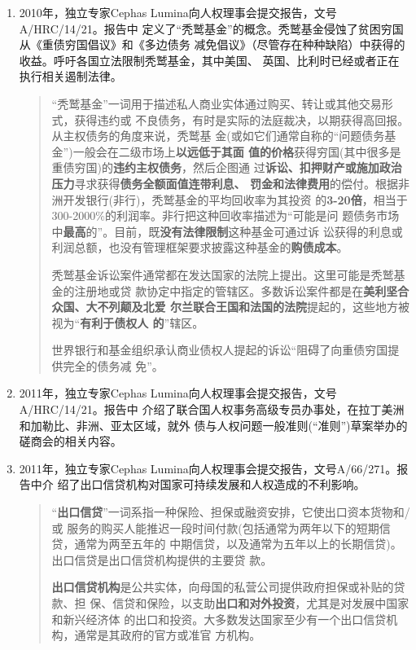 \begin{enumerate}
\item 2010年，独立专家Cephas Lumina向人权理事会提交报告，文号A/HRC/14/21。报告中
  定义了“秃鹫基金”的概念。秃鹫基金侵蚀了贫困穷国从《重债穷国倡议》和《多边债务
  减免倡议》（尽管存在种种缺陷）中获得的收益。呼吁各国立法限制秃鹫基金，其中美国、
  英国、比利时已经或者正在执行相关遏制法律。
  \begin{quotation}
    “秃鹫基金”一词用于描述私人商业实体通过购买、转让或其他交易形式，获得违约或
    不良债务，有时是实际的法庭裁决，以期获得高回报。从主权债务的角度来说，秃鹫基
    金(或如它们通常自称的“问题债务基金”)一般会在二级市场上\textbf{以远低于其面
      值的价格}获得穷国(其中很多是重债穷国)的\textbf{违约主权债务}，然后企图通
    过\textbf{诉讼、扣押财产或施加政治压力}寻求获得\textbf{债务全额面值连带利息、
      罚金和法律费用}的偿付。根据非洲开发银行(非行)，秃鹫基金的平均回收率为其投资
    的\textbf{3-20倍}，相当于300-2000\%的利润率。非行把这种回收率描述为“可能是问
    题债务市场中\textbf{最高}的”。目前，既\textbf{没有法律限制}这种基金可通过诉
    讼获得的利息或利润总额，也没有管理框架要求披露这种基金的\textbf{购债成本}。

    秃鹫基金诉讼案件通常都在发达国家的法院上提出。这里可能是秃鹫基金的注册地或贷
    款协定中指定的管辖区。多数诉讼案件都是在\textbf{美利坚合众国、大不列颠及北爱
      尔兰联合王国和法国的法院}提起的，这些地方被视为“\textbf{有利于债权人
      的}”辖区。

    世界银行和基金组织承认商业债权人提起的诉讼“阻碍了向重债穷国提供完全的债务减
    免”。
  \end{quotation}

\item 2011年，独立专家Cephas Lumina向人权理事会提交报告，文号A/HRC/14/21。报告中
  介绍了联合国人权事务高级专员办事处，在拉丁美洲和加勒比、非洲、亚太区域，就外
  债与人权问题一般准则(“准则”)草案举办的磋商会的相关内容。

\item 2011年，独立专家Cephas Lumina向人权理事会提交报告，文号A/66/271。报告中介
  绍了出口信贷机构对国家可持续发展和人权造成的不利影响。
  \begin{quotation}
    “\textbf{出口信贷}”一词系指一种保险、担保或融资安排，它使出口资本货物和/或
    服务的购买人能推迟一段时间付款(包括通常为两年以下的短期信贷，通常为两至五年的
    中期信贷，以及通常为五年以上的长期信贷)。出口信贷是出口信贷机构提供的主要贷
    款。

    \textbf{出口信贷机构}是公共实体，向母国的私营公司提供政府担保或补贴的贷款、担
    保、信贷和保险，以支助\textbf{出口和对外投资}，尤其是对发展中国家和新兴经济体
    的出口和投资。大多数发达国家至少有一个出口信贷机构，通常是其政府的官方或准官
    方机构。


\end{quotation}
\end{enumerate}
